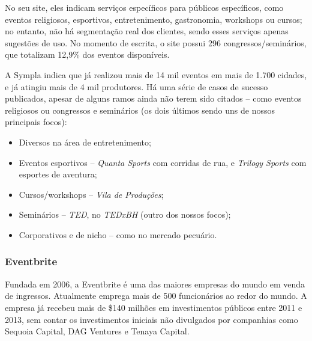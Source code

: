 \documentclass[12pt,a4paper,twoside,hyphens,english,brazil]{abntex2}
\begin{document}
No seu site, eles indicam serviços específicos para públicos específicos, como eventos religiosos, esportivos, entretenimento, gastronomia, workshops ou cursos; no entanto, não há segmentação real dos clientes, sendo esses serviços apenas sugestões de uso. No momento de escrita, o site possui 296 congressos/seminários, que totalizam 12,9\% dos eventos disponíveis.

A Sympla indica que já realizou mais de 14 mil eventos em mais de 1.700 cidades, e já atingiu mais de 4 mil produtores. Há uma série de casos de sucesso publicados\cite{sympla-cases}, apesar de alguns ramos ainda não terem sido citados -- como eventos religiosos ou congressos e seminários (os dois últimos sendo uns de nossos principais focos):
\begin{itemize}[itemsep=-1ex]
	\item Diversos na área de entretenimento;
	\item Eventos esportivos -- \emph{Quanta Sports} com corridas de rua, e \emph{Trilogy Sports} com esportes de aventura;
	\item Cursos/workshops -- \emph{Vila de Produções};
	\item Seminários -- \emph{TED}\footnotemark, no \emph{TEDxBH} (outro dos nossos focos);
	\item Corporativos e de nicho -- como no mercado pecuário.
\end{itemize}

\subsubsection*{Eventbrite}
Fundada em 2006, a Eventbrite é uma das maiores empresas do mundo em venda de ingressos. Atualmente emprega mais de 500 funcionários ao redor do mundo. A empresa já recebeu mais de \$140 milhões em investimentos públicos entre 2011 e 2013, sem contar os investimentos iniciais não divulgados por companhias como Sequoia Capital, DAG Ventures e Tenaya Capital. \cite{eventbrite-wiki}
\end{document}
